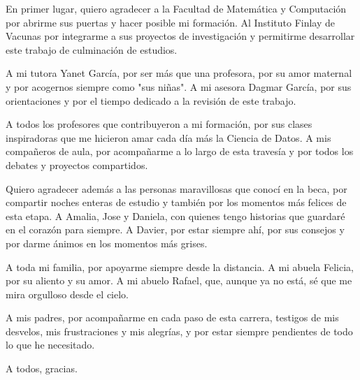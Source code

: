 \begin{acknowledgements}
    En primer lugar, quiero agradecer a la Facultad de Matemática y Computación por abrirme sus puertas y hacer posible mi formación. Al Instituto Finlay de Vacunas por integrarme a sus proyectos de investigación y permitirme desarrollar este trabajo de culminación de estudios.
    
    A mi tutora Yanet García, por ser más que una profesora, por su amor maternal y por acogernos siempre como "sus niñas". A mi asesora Dagmar García, por sus orientaciones y por el tiempo dedicado a la revisión de este trabajo.
    
    A todos los profesores que contribuyeron a mi formación, por sus clases inspiradoras que me hicieron amar cada día más la Ciencia de Datos. A mis compañeros de aula, por acompañarme a lo largo de esta travesía y por todos los debates y proyectos compartidos.
    
    Quiero agradecer además a las personas maravillosas que conocí en la beca, por compartir noches enteras de estudio y también por los momentos más felices de esta etapa. A Amalia, Jose y Daniela, con quienes tengo historias que guardaré en el corazón para siempre. A Davier, por estar siempre ahí, por sus consejos y por darme ánimos en los momentos más grises.
    
    A toda mi familia, por apoyarme siempre desde la distancia. A mi abuela Felicia, por su aliento y su amor. A mi abuelo Rafael, que, aunque ya no está, sé que me mira orgulloso desde el cielo.
    
    A mis padres, por acompañarme en cada paso de esta carrera, testigos de mis desvelos, mis frustraciones y mis alegrías, y por estar siempre pendientes de todo lo que he necesitado.
    
    A todos, gracias.

\end{acknowledgements}
